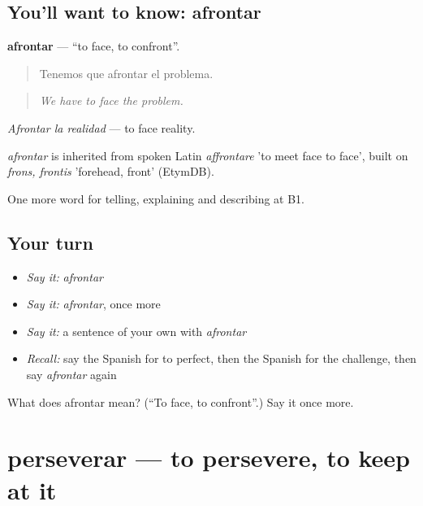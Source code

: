 \subsection*{You'll want to know: afrontar}
\textbf{afrontar} — \textquotedblleft{}to face, to confront\textquotedblright{}.

\begin{quote}
Tenemos que afrontar el problema.
\end{quote}

\begin{quote}
\emph{We have to face the problem.}
\end{quote}

\emph{Afrontar la realidad} — to face reality.

\begin{cousinweb}
\emph{afrontar} is inherited from spoken Latin \emph{affrontare} 'to meet face to face', built on \emph{frons, frontis} 'forehead, front' (EtymDB).
\end{cousinweb}

\begin{grammarlens}[title={What you've built}]
One more word for telling, explaining and describing at B1.
\end{grammarlens}

\subsection*{Your turn}
\begin{itemize}
\raggedright
  \item \emph{Say it:} \emph{afrontar}
  \item \emph{Say it:} \emph{afrontar}, once more
  \item \emph{Say it:} a sentence of your own with \emph{afrontar}
  \item \emph{Recall:} say the Spanish for to perfect, then the Spanish for the challenge, then say \emph{afrontar} again
\end{itemize}

\begin{tcolorbox}[breakable,colback=teal!4,colframe=teal!35!black,title={Before you move on}]
What does afrontar mean? (\textquotedblleft{}To face, to confront\textquotedblright{}.) Say it once more.
\end{tcolorbox}
\section[perseverar]{perseverar — to persevere, to keep at it}

